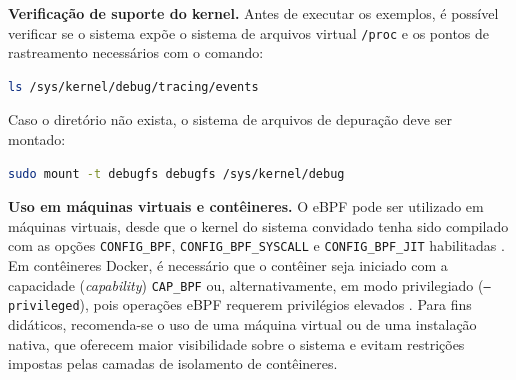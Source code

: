 \textbf{Verificação de suporte do kernel.}
Antes de executar os exemplos, é possível verificar se o sistema expõe o sistema de
arquivos virtual \texttt{/proc} e os pontos de rastreamento necessários com o
comando:

\begin{lstlisting}[language=bash]
ls /sys/kernel/debug/tracing/events
\end{lstlisting}

Caso o diretório não exista, o sistema de arquivos de depuração deve ser montado:

\begin{lstlisting}[language=bash]
sudo mount -t debugfs debugfs /sys/kernel/debug
\end{lstlisting}

\textbf{Uso em máquinas virtuais e contêineres.}
O eBPF pode ser utilizado em máquinas virtuais, desde que o kernel do sistema
convidado tenha sido compilado com as opções \texttt{CONFIG\_BPF},
\texttt{CONFIG\_BPF\_SYSCALL} e \texttt{CONFIG\_BPF\_JIT} habilitadas
\cite{linuxkernel2024}.
Em contêineres Docker, é necessário que o contêiner seja iniciado com a capacidade
(\textit{capability}) \texttt{CAP\_BPF} ou, alternativamente, em modo privilegiado
(\texttt{--privileged}), pois operações eBPF requerem privilégios elevados
\cite{gregg2019}.
Para fins didáticos, recomenda-se o uso de uma máquina virtual ou de uma instalação
nativa, que oferecem maior visibilidade sobre o sistema e evitam restrições
impostas pelas camadas de isolamento de contêineres.